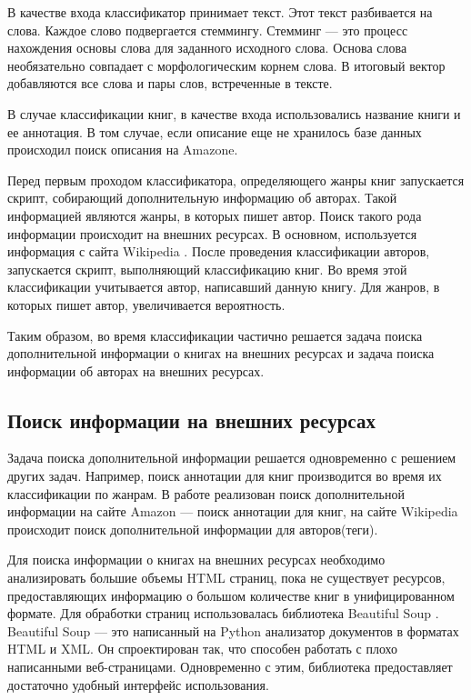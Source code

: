 В качестве входа классификатор принимает текст. Этот текст разбивается на слова. Каждое слово подвергается стеммингу. Стемминг \cite{stemming} --- это процесс нахождения основы слова для заданного исходного слова. Основа слова необязательно совпадает с морфологическим корнем слова. В итоговый вектор добавляются все слова и пары слов, встреченные в тексте.

В случае классификации книг, в качестве входа использовались название книги и ее аннотация. В том случае, если описание еще не хранилось базе данных происходил поиск описания на Amazone\cite{amazon}.

Перед первым проходом классификатора, определяющего жанры книг запускается скрипт, собирающий дополнительную информацию об авторах. Такой информацией являются жанры, в которых пишет автор. Поиск такого рода информации происходит на внешних ресурсах. В основном, используется информация с сайта Wikipedia \cite{wiki}. После проведения классификации авторов, запускается скрипт, выполняющий классификацию книг. Во время этой классификации учитывается автор, написавший данную книгу. Для жанров, в которых пишет автор, увеличивается вероятность.

Таким образом, во время классификации частично решается задача поиска дополнительной информации о книгах на внешних ресурсах и задача поиска информации об авторах на внешних ресурсах.


\subsection{Поиск информации на внешних ресурсах}

Задача поиска дополнительной информации решается одновременно с решением других задач. Например, поиск аннотации для книг производится во время их классификации по жанрам.
В работе реализован поиск дополнительной информации на сайте Amazon \cite{amazon} --- поиск аннотации для книг, на сайте Wikipedia \cite{wiki} происходит поиск дополнительной информации для авторов(теги).

Для поиска информации о книгах на внешних ресурсах необходимо анализировать большие объемы HTML страниц, \tk пока не существует ресурсов, предоставляющих информацию о большом количестве книг в унифицированном формате. Для обработки страниц использовалась библиотека Beautiful Soup \cite{beaut-soup}. Beautiful Soup --- это написанный на Python анализатор документов в форматах HTML и XML. Он спроектирован так, что способен работать с плохо написанными  веб-страницами. Одновременно с этим, библиотека предоставляет достаточно удобный интерфейс использования.


